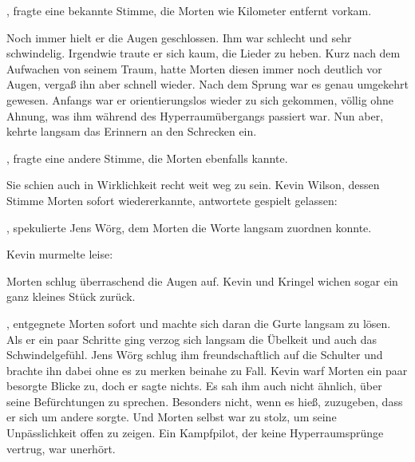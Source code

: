 , fragte eine bekannte Stimme, die Morten wie Kilometer entfernt vorkam.

\par

Noch immer hielt er die Augen geschlossen. Ihm war schlecht und sehr schwindelig. Irgendwie traute er sich kaum, die Lieder zu heben. Kurz nach dem Aufwachen von seinem Traum, hatte Morten diesen immer noch deutlich vor Augen, vergaß ihn aber schnell wieder. Nach dem Sprung war es genau umgekehrt gewesen. Anfangs war er orientierungslos wieder zu sich gekommen, völlig ohne Ahnung, was ihm während des Hyperraumübergangs passiert war. Nun aber, kehrte langsam das Erinnern an den Schrecken ein.

\par

, fragte eine andere Stimme, die Morten ebenfalls kannte.

\par

Sie schien auch in Wirklichkeit recht weit weg zu sein. Kevin Wilson, dessen Stimme Morten sofort wiedererkannte, antwortete gespielt gelassen: 

\par

, spekulierte Jens Wörg, dem Morten die Worte langsam zuordnen konnte.

\par

Kevin murmelte leise: 

\par

Morten schlug überraschend die Augen auf. Kevin und Kringel wichen sogar ein ganz kleines Stück zurück.

\par

, entgegnete Morten sofort und machte sich daran die Gurte langsam zu lösen. Als er ein paar Schritte ging verzog sich langsam die Übelkeit und auch das Schwindelgefühl. Jens Wörg schlug ihm freundschaftlich auf die Schulter und brachte ihn dabei ohne es zu merken beinahe zu Fall. Kevin warf Morten ein paar besorgte Blicke zu, doch er sagte nichts. Es sah ihm auch nicht ähnlich, über seine Befürchtungen zu sprechen. Besonders nicht, wenn es hieß, zuzugeben, dass er sich um andere sorgte. Und Morten selbst war zu stolz, um seine Unpässlichkeit offen zu zeigen. Ein Kampfpilot, der keine Hyperraumsprünge vertrug, war unerhört.

